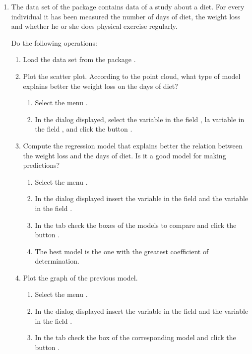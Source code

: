 \begin{enumerate}[leftmargin=*]
\item The data set  of the package  contains data of a study about a diet.
For every individual it has been measured the number of days of diet, the weight loss and whether he or she does
physical exercise regularly.

Do the following operations:
\begin{enumerate}
\item Load the data set  from the package .

\item Plot the scatter plot.
According to the point cloud, what type of model explains better the weight loss on the days of diet?
\begin{indication}
\begin{enumerate}
\item Select the menu .
\item In the dialog displayed, select the variable  in the field , la
variable  in the field , and click the button .
\end{enumerate}
\end{indication}

\item Compute the regression model that explains better the relation between the weight loss and the days of diet. 
Is it a good model for making predictions?
\begin{indication}
\begin{enumerate}
\item Select the menu .
\item In the dialog displayed insert the variable  in the field  and the
variable  in the field .
\item In the  tab check the boxes of the models to compare and click the button .
\item The best model is the one with the greatest coefficient of determination.
\end{enumerate}
\end{indication}

\item Plot the graph of the previous model. 
\begin{indication}
\begin{enumerate}
\item Select the menu .
\item In the dialog displayed insert the variable  in the field 
and the variable  in the field .
\item In the tab  check the box of the corresponding model and click the button .
\end{enumerate}
\end{indication}


\end{enumerate}
\end{enumerate}
